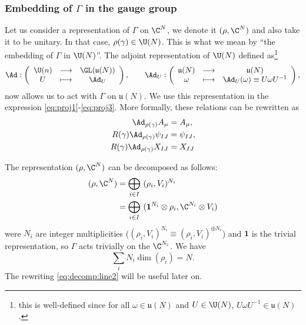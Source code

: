 \documentclass{worksheetclass}
\begin{document}
        \subsubsection{Embedding of $\Gamma$ in the gauge group}

            Let us consider a representation of $\Gamma$ on $\C^N$, we denote it $(\rho,\C^N)$ and also take it to be unitary. In that case, $\rho(\gamma)\in\U(N)$. This is what we mean by ``the embedding of $\Gamma$ in $\U(N)$''. The adjoint representation of $\U(N)$ defined as\footnote{this is well-defined since for all $\omega\in\mathfrak{u}(N)$ and $U\in\U(N)$, $U\omega U^{-1}\in\mathfrak{u}(N)$.}
            \begin{equation}
                \Ad:\left(
                \begin{array}{ccc}
                    \U(n) & \longrightarrow & \GL(\mathfrak{u}(N)) \\
                    U & \longmapsto & \Ad_U
                \end{array}
                \right),\qquad
                \Ad_U:\left(
                \begin{array}{ccc}
                    \mathfrak{u}(N) & \longrightarrow & \mathfrak{u}(N) \\
                    \omega & \longmapsto & \Ad_U(\omega)\equiv U\omega U^{-1}
                \end{array}
                \right),
            \end{equation}
            now allows us to act with $\Gamma$ on $\mathfrak{u}(N)$. We use this representation in the expression \eqref{eq:proj1}-\eqref{eq:proj3}. More formally, these relations can be rewritten as
            \begin{align}
                \Ad_{\rho(\gamma)}A_\mu  &= A_\mu,\\
                R(\gamma)\Ad_{\rho(\gamma)}\psi_{IJ}  &= \psi_{IJ},\\
                R(\gamma)\Ad_{\rho(\gamma)}X_{IJ} &= X_{IJ}
            \end{align}

            The representation $(\rho,\C^N)$ can be decomposed as follows:
            \begin{align}
                (\rho,\C^N) &= \bigoplus_{i\in I}~(\rho_i,V_i)^{N_i} \label{eq:decomp:line1} \\
                &= \bigoplus_{i\in I}~(\boldsymbol{1}^{N_i}\otimes\rho_i,\C^{N_i}\otimes V_i) \label{eq:decomp:line2}
            \end{align}
            were $N_i$ are integer multiplicities ($(\rho_i,V_i)^{N_i}\equiv(\rho_i,V_i)^{\oplus N_i}$) and $\boldsymbol{1}$ is the trivial representation, so $\Gamma$ acts trivially on the $\C^{N_i}$. We have
            \begin{equation}
                \sum_iN_i\dim(\rho_i)=N.
            \end{equation}
            The rewriting \eqref{eq:decomp:line2} will be useful later on.
\end{document}
